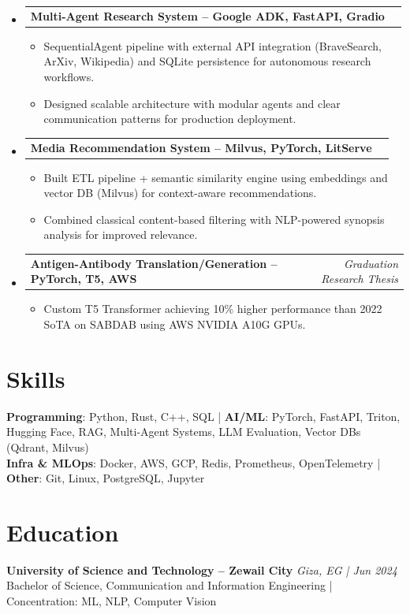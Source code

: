 \documentclass[10pt, letterpaper]{extarticle}
\makeatletter
\newcommand{\resumeItem}[1]{\item{#1}}
\newcommand{\resumeProjectHeading}[2]{
    \item
    \begin{tabular*}{1.0\textwidth}[t]{l@{\extracolsep{\fill}}r}
       \textbf{#1} & \textit{#2} \\
    \end{tabular*}\vspace{1pt}
}
\makeatother
\begin{document}
\begin{itemize}[label={}, leftmargin=0in]

 \resumeProjectHeading{Multi-Agent Research System -- Google ADK, FastAPI, Gradio}{}
 \begin{itemize}[label={--}]
   \resumeItem{SequentialAgent pipeline with external API integration (BraveSearch, ArXiv, Wikipedia) and SQLite persistence for autonomous research workflows.}
   \resumeItem{Designed scalable architecture with modular agents and clear communication patterns for production deployment.}
 \end{itemize}

 \resumeProjectHeading{Media Recommendation System -- Milvus, PyTorch, LitServe}{}
 \begin{itemize}[label={--}]
   \resumeItem{Built ETL pipeline + semantic similarity engine using embeddings and vector DB (Milvus) for context-aware recommendations.}
   \resumeItem{Combined classical content-based filtering with NLP-powered synopsis analysis for improved relevance.}
 \end{itemize}

 \resumeProjectHeading{Antigen-Antibody Translation/Generation -- PyTorch, T5, AWS}{Graduation Research Thesis}
 \begin{itemize}[label={--}]
   \resumeItem{Custom T5 Transformer achieving 10\% higher performance than 2022 SoTA on SABDAB using AWS NVIDIA A10G GPUs.}
 \end{itemize}

\end{itemize}

\section{Skills}

\textbf{Programming}: Python, Rust, C++, SQL \quad | \quad 
\textbf{AI/ML}: PyTorch, FastAPI, Triton, Hugging Face, RAG, Multi-Agent Systems, LLM Evaluation, Vector DBs (Qdrant, Milvus) \\
\textbf{Infra \& MLOps}: Docker, AWS, GCP, Redis, Prometheus, OpenTelemetry \quad | \quad 
\textbf{Other}: Git, Linux, PostgreSQL, Jupyter

\section{Education}

\textbf{University of Science and Technology -- Zewail City} \hfill \textit{Giza, EG | Jun 2024} \\
Bachelor of Science, Communication and Information Engineering \quad | \quad Concentration: ML, NLP, Computer Vision
\end{document}
